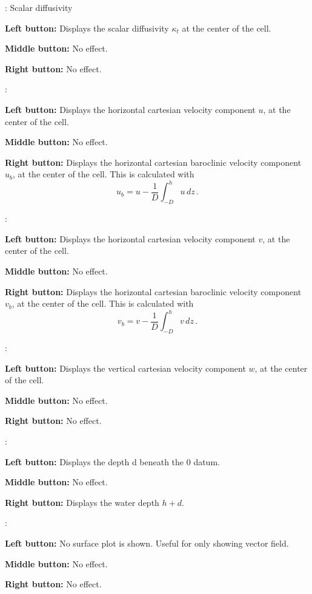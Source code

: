 \begin{list}{}
\item {}: Scalar diffusivity
\begin{list}{}
\item {\bf Left button:} Displays the scalar diffusivity $\kappa_t$ at the center of the cell.
\item {\bf Middle button:} No effect.
\item {\bf Right button:} No effect.
\end{list}
\item {}: 
\begin{list}{}
\item {\bf Left button:} Displays the horizontal cartesian velocity component $u$, at the center of the cell.
\item {\bf Middle button:} No effect.
\item {\bf Right button:} Displays the horizontal cartesian baroclinic velocity component $u_b$, at the center of the cell.
This is calculated with
\[
u_b = u - \frac{1}{D}\int_{-D}^h u\,dz\,.
\]
\end{list}
\item {}: 
\begin{list}{}
\item {\bf Left button:} Displays the horizontal cartesian velocity component $v$, at the center of the cell.
\item {\bf Middle button:} No effect.
\item {\bf Right button:} Displays the horizontal cartesian baroclinic velocity component $v_b$, at the center of the cell.
This is calculated with
\[
v_b = v - \frac{1}{D}\int_{-D}^h v\,dz\,.
\]
\end{list}
\item {}: 
\begin{list}{}
\item {\bf Left button:} Displays the vertical cartesian velocity component $w$, at the center of the cell.
\item {\bf Middle button:} No effect.
\item {\bf Right button:} No effect.
\end{list}
\item {}: 
\begin{list}{}
\item {\bf Left button:} Displays the depth d beneath the 0 datum.
\item {\bf Middle button:} No effect.
\item {\bf Right button:} Displays the water depth $h+d$.
\end{list}
\item {}: 
\begin{list}{}
\item {\bf Left button:} No surface plot is shown.  Useful for only showing vector field.
\item {\bf Middle button:} No effect.
\item {\bf Right button:} No effect.
\end{list}
\end{list}

